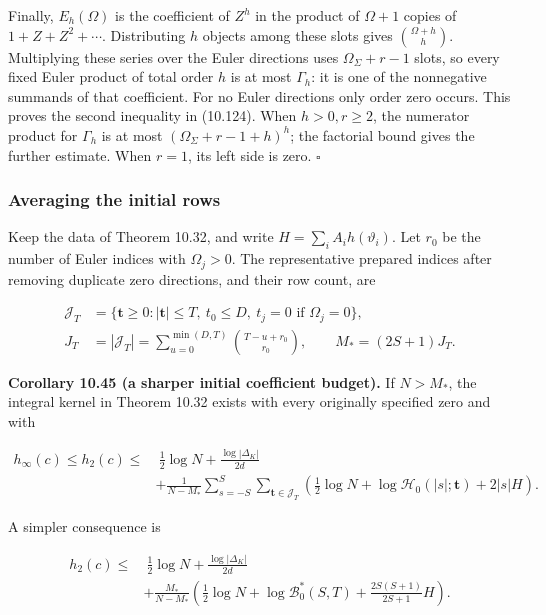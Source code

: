 \documentclass[
  11pt,
  a4paper,
]{article}
\begin{document}
Finally, \(E_h(\Omega)\) is the coefficient of \(Z^h\) in the product of
\(\Omega+1\) copies of \(1+Z+Z^2+\cdots\). Distributing \(h\) objects
among these slots gives \(\binom{\Omega+h}{h}\). Multiplying these
series over the Euler directions uses \(\Omega_\Sigma+r-1\) slots, so
every fixed Euler product of total order \(h\) is at most \(\Gamma_h\):
it is one of the nonnegative summands of that coefficient. For no Euler
directions only order zero occurs. This proves the second inequality in
(10.124). When \(h>0,r\ge2\), the numerator product for \(\Gamma_h\) is
at most \((\Omega_\Sigma+r-1+h)^h\); the factorial bound gives the
further estimate. When \(r=1\), its left side is zero. \(\square\)

\subsubsection{Averaging the initial
rows}\label{averaging-the-initial-rows}

Keep the data of Theorem 10.32, and write
\(H=\sum_i A_i h(\vartheta_i)\). Let \(r_0\) be the number of Euler
indices with \(\Omega_j>0\). The representative prepared indices after
removing duplicate zero directions, and their row count, are

\[
\begin{aligned}
\mathcal J_T&=\{\boldsymbol t\ge0:|\boldsymbol t|\le T,\ t_0\le D,
\ t_j=0\text{ if }\Omega_j=0\},\\
J_T&=|\mathcal J_T|=
\sum_{u=0}^{\min(D,T)}\binom{T-u+r_0}{r_0},
\qquad M_*=(2S+1)J_T.
\end{aligned}
\tag{10.126}
\]

\textbf{Corollary 10.45 (a sharper initial coefficient budget).} If
\(N>M_*\), the integral kernel in Theorem 10.32 exists with every
originally specified zero and with

\[
\begin{aligned}
h_\infty(c)\le h_2(c)\le&\ \tfrac12\log N+
\frac{\log|\Delta_K|}{2d}\\
&+\frac1{N-M_*}\sum_{s=-S}^S\sum_{\boldsymbol t\in\mathcal J_T}
\left(\tfrac12\log N+
\log\mathcal H_0(|s|;\boldsymbol t)+2|s|H\right).
\end{aligned}
\tag{10.127}
\]

A simpler consequence is

\[
\begin{aligned}
h_2(c)\le&\ \tfrac12\log N+\frac{\log|\Delta_K|}{2d}\\
&+\frac{M_*}{N-M_*}
\left(\tfrac12\log N+\log\mathcal B_0^*(S,T)
+\frac{2S(S+1)}{2S+1}H\right).
\end{aligned}
\tag{10.128}
\]
\end{document}
